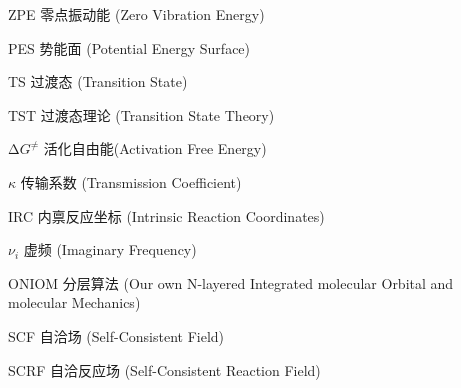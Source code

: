 \documentclass[degree=doctor]{thuthesis}
\begin{document}
\begin{denotation}[3cm]
  \item[ZPE] 零点振动能 (Zero Vibration Energy)
  \item[PES] 势能面 (Potential Energy Surface)
  \item[TS] 过渡态 (Transition State)
  \item[TST] 过渡态理论 (Transition State Theory)
  \item[$\increment G^\neq$] 活化自由能(Activation Free Energy)
  \item[$\kappa$] 传输系数 (Transmission Coefficient)
  \item[IRC] 内禀反应坐标 (Intrinsic Reaction Coordinates)
  \item[$\nu_i$] 虚频 (Imaginary Frequency)
  \item[ONIOM] 分层算法 (Our own N-layered Integrated molecular Orbital and molecular Mechanics)
  \item[SCF] 自洽场 (Self-Consistent Field)
  \item[SCRF] 自洽反应场 (Self-Consistent Reaction Field)
\end{denotation}

\clearpage
\OMIT
\end{document}
